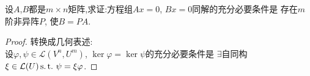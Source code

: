 \begin{example}
  设$A$,$B$都是$m \times n$矩阵,求证:方程组$Ax=0$, $Bx=0$同解的充分必要条件是
  存在$m$阶非异阵$P$, 使$B=PA$.
\end{example}

\begin{proof}
  转换成几何表述:\\
  设$\varphi,\psi \in \mathcal{L}(V^n,U^m)$,
  $\ker\varphi = \ker\psi$的充分必要条件是
  $\exists$自同构$\xi \in \mathcal{L}(U) \operatorname{s.t.{}} \psi=\xi\varphi$.
\end{proof}
